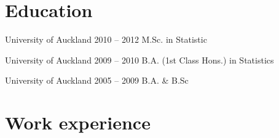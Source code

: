 \documentclass{tccv}
\begin{document}
\section{Education}

\begin{yearlist}

\item[University of Auckland]{2010 -- 2012}
     {M.Sc. in Statistic}
{}

\item[University of Auckland]{2009 -- 2010}
     {B.A. (1st Class Hons.) \newline in Statistics}
{}

\item[University of Auckland]{2005 -- 2009}
  {B.A. \& B.Sc}
  {}





\end{yearlist}

\vspace{1cm}


\section{Work experience}
\end{document}

